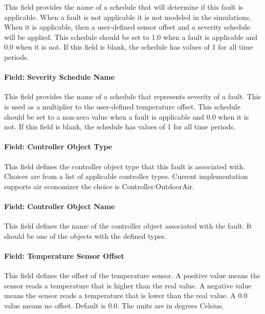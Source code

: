This field provides the name of a schedule that will determine if this fault is applicable. When a fault is not applicable it is not modeled in the simulations. When it is applicable, then a user-defined sensor offset and a severity schedule will be applied. This schedule should be set to 1.0 when a fault is applicable and 0.0 when it is not. If this field is blank, the schedule has values of 1 for all time periods.

\paragraph{Field: Severity Schedule Name}\label{field-severity-schedule-name}

This field provides the name of a schedule that represents severity of a fault. This is used as a multiplier to the user-defined temperature offset. This schedule should be set to a non-zero value when a fault is applicable and 0.0 when it is not. If this field is blank, the schedule has values of 1 for all time periods.

\paragraph{Field: Controller Object Type}\label{field-controller-object-type}

This field defines the controller object type that this fault is associated with. Choices are from a list of applicable controller types. Current implementation supports air economizer the choice is Controller:OutdoorAir.

\paragraph{Field: Controller Object Name}\label{field-controller-object-name}

This field defines the name of the controller object associated with the fault. It should be one of the objects with the defined types.

\paragraph{Field: Temperature Sensor Offset}\label{field-temperature-sensor-offset}

This field defines the offset of the temperature sensor. A positive value means the sensor reads a temperature that is higher than the real value. A negative value means the sensor reads a temperature that is lower than the real value. A 0.0 value means no offset. Default is 0.0. The units are in degrees Celsius.

